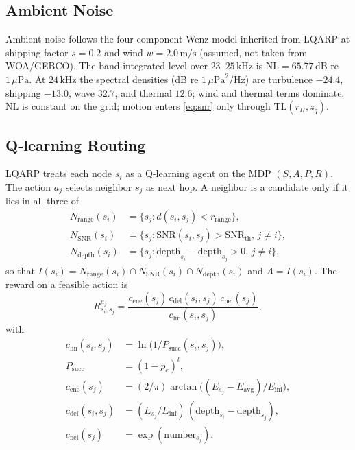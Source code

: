 \subsection{Ambient Noise}
\label{sec:prelim:noise}
Ambient noise follows the four-component Wenz model inherited from
LQARP \cite{liu2026lqarp} at shipping factor $s=0.2$ and wind
$w=2.0\,\mathrm{m/s}$ (assumed, not taken from WOA/GEBCO).
The band-integrated level over $23$--$25\,\mathrm{kHz}$ is
$\mathrm{NL}=65.77\,\mathrm{dB}$ re $1\,\mu\mathrm{Pa}$.
At $24\,\mathrm{kHz}$ the spectral densities (dB re
$1\,\mu\mathrm{Pa}^2/\mathrm{Hz}$) are turbulence $-24.4$,
shipping $-13.0$, wave $32.7$, and thermal $12.6$; wind and thermal
terms dominate.
$\mathrm{NL}$ is constant on the grid; motion enters
\eqref{eq:snr} only through $\mathrm{TL}(r_H,z_q)$.

\subsection{Q-learning Routing}
\label{sec:prelim:q}
LQARP treats each node $s_i$ as a Q-learning agent
\cite{liu2026lqarp} on the MDP $(S,A,P,R)$.
The action $a_j$ selects neighbor $s_j$ as next hop.
A neighbor is a candidate only if it lies in all three of
\begin{align}
\label{eq:cand}
N_{\mathrm{range}}(s_i)
&= \{s_j:d(s_i,s_j)<r_{\mathrm{range}}\},\nonumber\\
N_{\mathrm{SNR}}(s_i)
&= \{s_j:\mathrm{SNR}(s_i,s_j)>\mathrm{SNR}_{\mathrm{th}},\,j\neq i\},\nonumber\\
N_{\mathrm{depth}}(s_i)
&= \{s_j:\mathrm{depth}_{s_i}-\mathrm{depth}_{s_j}>0,\,j\neq i\},
\end{align}
so that
$I(s_i)=N_{\mathrm{range}}(s_i)\cap N_{\mathrm{SNR}}(s_i)\cap
N_{\mathrm{depth}}(s_i)$ and $A=I(s_i)$.
The reward on a feasible action is
\begin{equation}
\label{eq:reward_lqarp}
R^{a_j}_{s_i,s_j}
= \frac{c_{\mathrm{ene}}(s_j)\,c_{\mathrm{del}}(s_i,s_j)\,
c_{\mathrm{nei}}(s_j)}{c_{\mathrm{lin}}(s_i,s_j)},
\end{equation}
with
\begin{align}
\label{eq:factors}
c_{\mathrm{lin}}(s_i,s_j)
&= \ln\!\bigl(1/P_{\mathrm{succ}}(s_i,s_j)\bigr),\nonumber\\
P_{\mathrm{succ}}
&= (1-p_e)^l,\nonumber\\
c_{\mathrm{ene}}(s_j)
&= (2/\pi)\arctan\bigl((E_{s_j}-E_{\mathrm{avg}})/E_{\mathrm{ini}}\bigr),\nonumber\\
c_{\mathrm{del}}(s_i,s_j)
&= (E_{s_j}/E_{\mathrm{ini}})\,
(\mathrm{depth}_{s_i}-\mathrm{depth}_{s_j}),\nonumber\\
c_{\mathrm{nei}}(s_j)
&= \exp(\mathrm{number}_{s_j}).
\end{align}
